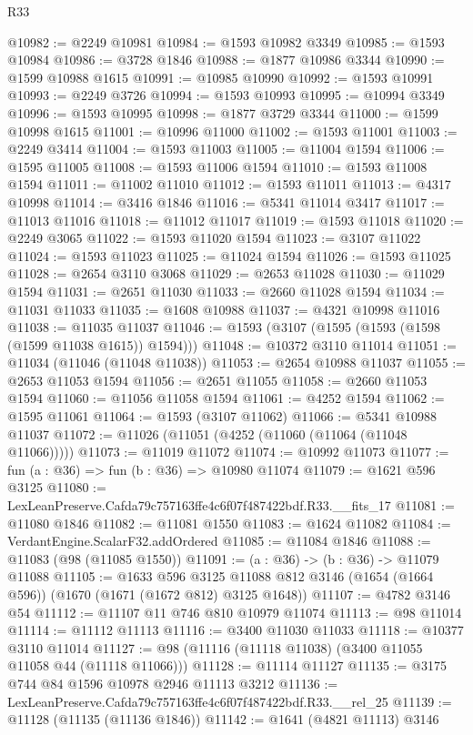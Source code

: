 \begin{lexlean}{R33}
\begin{coremodule}
@10982 := @2249 @10981
@10984 := @1593 @10982 @3349
@10985 := @1593 @10984
@10986 := @3728 @1846
@10988 := @1877 @10986 @3344
@10990 := @1599 @10988 @1615
@10991 := @10985 @10990
@10992 := @1593 @10991
@10993 := @2249 @3726
@10994 := @1593 @10993
@10995 := @10994 @3349
@10996 := @1593 @10995
@10998 := @1877 @3729 @3344
@11000 := @1599 @10998 @1615
@11001 := @10996 @11000
@11002 := @1593 @11001
@11003 := @2249 @3414
@11004 := @1593 @11003
@11005 := @11004 @1594
@11006 := @1595 @11005
@11008 := @1593 @11006 @1594
@11010 := @1593 @11008 @1594
@11011 := @11002 @11010
@11012 := @1593 @11011
@11013 := @4317 @10998
@11014 := @3416 @1846
@11016 := @5341 @11014 @3417
@11017 := @11013 @11016
@11018 := @11012 @11017
@11019 := @1593 @11018
@11020 := @2249 @3065
@11022 := @1593 @11020 @1594
@11023 := @3107 @11022
@11024 := @1593 @11023
@11025 := @11024 @1594
@11026 := @1593 @11025
@11028 := @2654 @3110 @3068
@11029 := @2653 @11028
@11030 := @11029 @1594
@11031 := @2651 @11030
@11033 := @2660 @11028 @1594
@11034 := @11031 @11033
@11035 := @1608 @10988
@11037 := @4321 @10998 @11016
@11038 := @11035 @11037
@11046 := @1593 (@3107 (@1595 (@1593 (@1598 (@1599 @11038 @1615)) @1594)))
@11048 := @10372 @3110 @11014
@11051 := @11034 (@11046 (@11048 @11038))
@11053 := @2654 @10988 @11037
@11055 := @2653 @11053 @1594
@11056 := @2651 @11055
@11058 := @2660 @11053 @1594
@11060 := @11056 @11058 @1594
@11061 := @4252 @1594
@11062 := @1595 @11061
@11064 := @1593 (@3107 @11062)
@11066 := @5341 @10988 @11037
@11072 := @11026 (@11051 (@4252 (@11060 (@11064 (@11048 @11066)))))
@11073 := @11019 @11072
@11074 := @10992 @11073
@11077 := fun (a : @36) => fun (b : @36) => @10980 @11074
@11079 := @1621 @596 @3125
@11080 := LexLeanPreserve.Cafda79c757163ffe4c6f07f487422bdf.R33.__fits_17
@11081 := @11080 @1846
@11082 := @11081 @1550
@11083 := @1624 @11082
@11084 := VerdantEngine.ScalarF32.addOrdered
@11085 := @11084 @1846
@11088 := @11083 (@98 (@11085 @1550))
@11091 := (a : @36) -> (b : @36) -> @11079 @11088
@11105 := @1633
    @596
    @3125
    @11088
    @812
    @3146
    (@1654 (@1664 @596))
    (@1670 (@1671 (@1672 @812) @3125 @1648))
@11107 := @4782 @3146 @54
@11112 := @11107 @11 @746 @810 @10979 @11074
@11113 := @98 @11014
@11114 := @11112 @11113
@11116 := @3400 @11030 @11033
@11118 := @10377 @3110 @11014
@11127 := @98 (@11116 (@11118 @11038) (@3400 @11055 @11058 @44 (@11118 @11066)))
@11128 := @11114 @11127
@11135 := @3175 @744 @84 @1596 @10978 @2946 @11113 @3212
@11136 := LexLeanPreserve.Cafda79c757163ffe4c6f07f487422bdf.R33.__rel_25
@11139 := @11128 (@11135 (@11136 @1846))
@11142 := @1641 (@4821 @11113) @3146

\end{coremodule}
\end{lexlean}
